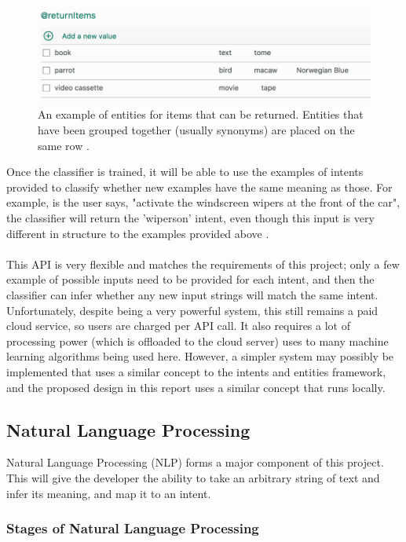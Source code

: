 \documentclass[12pt]{article}
\begin{document}
\begin{center}
\begin{figure}[H]
  \includegraphics[width=\textwidth]{returnitems.png}
  \caption{An example of entities for items that can be returned. Entities that have been grouped together (usually synonyms) are placed on the same row \cite{RefWorks:34}.}
\end{figure}
\end{center}
Once the classifier is trained, it will be able to use the examples of intents provided to classify whether new examples have the same meaning as those. For example, is the user says, "activate the windscreen wipers at the front of the car", the classifier will return the 'wipers\textunderscore on' intent, even though this input is very different in structure to the examples provided above \cite{RefWorks:32}.
\\
\\
This API is very flexible and matches the requirements of this project; only a few example of possible inputs need to be provided for each intent, and then the classifier can infer whether any new input strings will match the same intent. Unfortunately, despite being a very powerful system, this still remains a paid cloud service, so users are charged per API call. It also requires a lot of processing power (which is offloaded to the cloud server) uses to many machine learning algorithms being used here. However, a simpler system may possibly be implemented that uses a similar concept to the intents and entities framework, and the proposed design in this report uses a similar concept that runs locally.

\subsection{Natural Language Processing}

Natural Language Processing (NLP) forms a major component of this project. This will give the developer the ability to take an arbitrary string of text and infer its meaning, and map it to an intent.

\subsubsection{Stages of Natural Language Processing}
\end{document}
